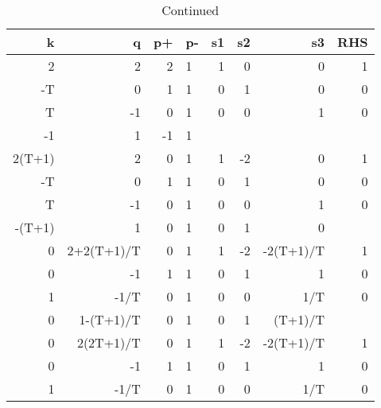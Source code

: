 \begin{table}[ht]
  \ContinuedFloat
  \caption{Continued}

  \begin{tabular}{rrrlrrrr}
    k      & q          & p+ & p- & s1        & s2         & s3          & RHS       \\ \hline
    2      & 2          & 2  & 1  & 1         & 0          & 0           & 1         \\
    -T     & 0          & 1  & 1  & 0         & 1          & 0           & 0         \\
    T      & -1         & 0  & 1  & 0         & 0          & 1           & 0         \\
    -1     & 1          & -1 & 1  &           &            &             &           \\ \hline
    2(T+1) & 2          & 0  & 1  & 1         & -2         & 0           & 1         \\ \hline
    -T     & 0          & 1  & 1  & 0         & 1          & 0           & 0         \\
    T      & -1         & 0  & 1  & 0         & 0          & 1           & 0         \\
    -(T+1) & 1          & 0  & 1  & 0         & 1          & 0           &           \\ \hline
    0      & 2+2(T+1)/T & 0  & 1  & 1         & -2         & -2(T+1)/T   & 1         \\ \hline
    0      & -1         & 1  & 1  & 0         & 1          & 1           & 0         \\
    1      & -1/T       & 0  & 1  & 0         & 0          & 1/T         & 0         \\
    0      & 1-(T+1)/T  & 0  & 1  & 0         & 1          & (T+1)/T     &           \\ \hline
    0      & 2(2T+1)/T  & 0  & 1  & 1         & -2         & -2(T+1)/T   & 1         \\ \hline
    0      & -1         & 1  & 1  & 0         & 1          & 1           & 0         \\
    1      & -1/T       & 0  & 1  & 0         & 0          & 1/T         & 0         \\

\end{tabular}
\end{table}
